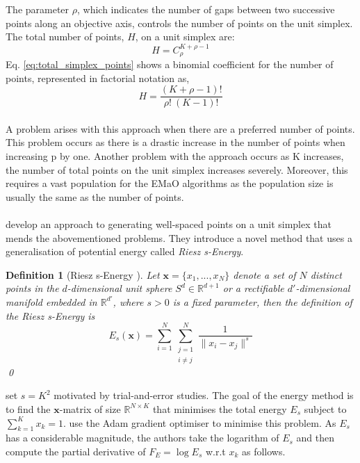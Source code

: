\documentclass[mscthesis, 11pt]{usiinfthesis}
\theoremstyle{newdefinition}
\newtheorem{definition}{Definition}[section]
\begin{document}
The parameter $\rho$, which indicates the number of gaps between two successive points along an objective axis, controls the number of points on the unit simplex. The total number of points, $H$, on a unit simplex are:
\begin{equation}\label{eq:total_simplex_points}
    H = C_{\rho}^{K + \rho - 1}
\end{equation}
Eq. \ref{eq:total_simplex_points} shows a binomial coefficient for the number of points, represented in factorial notation as,
\begin{equation}
    H = \frac{(K + \rho - 1)!}{\rho ! \: (K - 1) !}
\end{equation}
\\
A problem arises with this approach when there are a preferred number of points. This problem occurs as there is a drastic increase in the number of points when increasing p by one. Another problem with the \cite{das_normal-boundary_1998} approach occurs as K increases, the number of total points on the unit simplex increases severely. Moreover, this requires a vast population for the EMaO algorithms as the population size is usually the same as the number of points. 
\\\\
\cite{blank_generating_2021} develop an approach to generating well-spaced points on a unit simplex that mends the abovementioned problems. They introduce a novel method that uses a generalisation of potential energy called \emph{Riesz s-Energy}. 
\begin{definition}[Riesz s-Energy \cite{hardin_minimal_2005}]
    Let $\mathbf{x} = \{x_1, ..., x_N\}$ denote a set of $N$ distinct points in the $d$-dimensional unit sphere $S^d \in \mathbb{R}^{d+1}$ or a rectifiable $d'$-dimensional manifold embedded in $\mathbb{R}^{d'}$, where $s > 0$ is a fixed parameter, then the definition of the Riesz s-Energy is
    \begin{equation}
        E_s (\mathbf{x}) = \sum_{i = 1}^N \sum_{\substack{j = 1 \\ i \neq j}}^N \frac{1}{\lVert x_i - x_j \rVert^s}
    \end{equation}
    \qed
\end{definition}
\cite[~p.~53]{blank_generating_2021} set $s = K^2$ motivated by trial-and-error studies. The goal of the energy method is to find the $\mathbf{x}$-matrix of size $\mathbb{R}^{N \times K}$ that minimises the total energy $E_s$ subject to $\sum_{k=1}^K x_k = 1$. \cite{blank_generating_2021} use the Adam gradient optimiser to minimise this problem. As $E_s$ has a considerable magnitude, the authors take the logarithm of $E_s$ and then compute the partial derivative of $F_E = \log E_s$ w.r.t $x_k$ as follows.
\end{document}
